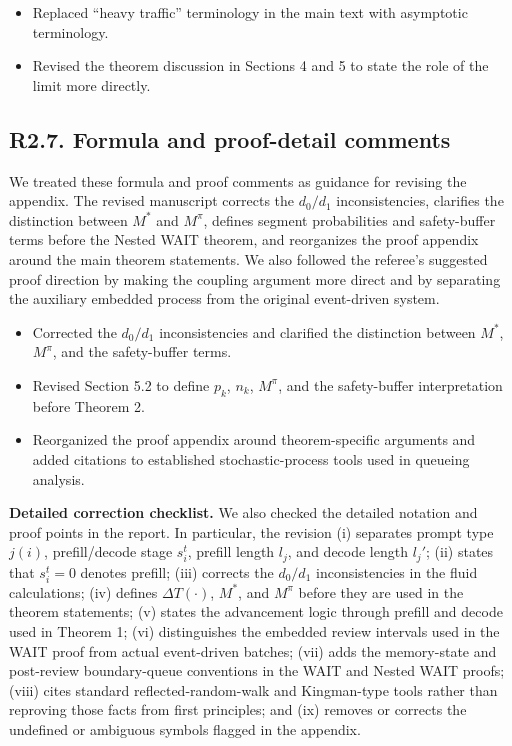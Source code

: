 \changes
\begin{itemize}
    \item Replaced ``heavy traffic'' terminology in the main text with asymptotic terminology.
    \item Revised the theorem discussion in Sections 4 and 5 to state the role of the limit more directly.
\end{itemize}

\subsection*{R2.7. Formula and proof-detail comments}


\response We treated these formula and proof comments as guidance for revising the appendix. The revised manuscript corrects the \(d_0/d_1\) inconsistencies, clarifies the distinction between \(M^*\) and \(M^\pi\), defines segment probabilities and safety-buffer terms before the Nested WAIT theorem, and reorganizes the proof appendix around the main theorem statements. We also followed the referee's suggested proof direction by making the coupling argument more direct and by separating the auxiliary embedded process from the original event-driven system.

\changes
\begin{itemize}
    \item Corrected the \(d_0/d_1\) inconsistencies and clarified the distinction between \(M^*\), \(M^\pi\), and the safety-buffer terms.
    \item Revised Section 5.2 to define \(p_k\), \(n_k\), \(M^\pi\), and the safety-buffer interpretation before Theorem 2.
    \item Reorganized the proof appendix around theorem-specific arguments and added citations to established stochastic-process tools used in queueing analysis.
\end{itemize}

\vspace{0.25em}
\noindent\textbf{Detailed correction checklist.} We also checked the detailed notation and proof points in the report. In particular, the revision (i) separates prompt type \(j(i)\), prefill/decode stage \(s_i^t\), prefill length \(l_j\), and decode length \(l_j'\); (ii) states that \(s_i^t=0\) denotes prefill; (iii) corrects the \(d_0/d_1\) inconsistencies in the fluid calculations; (iv) defines \(\Delta T(\cdot)\), \(M^*\), and \(M^\pi\) before they are used in the theorem statements; (v) states the advancement logic through prefill and decode used in Theorem 1; (vi) distinguishes the embedded review intervals used in the WAIT proof from actual event-driven batches; (vii) adds the memory-state and post-review boundary-queue conventions in the WAIT and Nested WAIT proofs; (viii) cites standard reflected-random-walk and Kingman-type tools rather than reproving those facts from first principles; and (ix) removes or corrects the undefined or ambiguous symbols flagged in the appendix.

